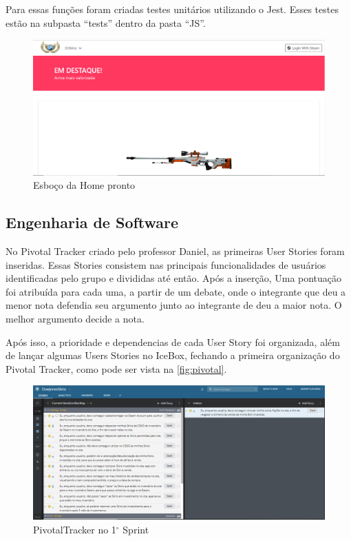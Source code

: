 Para essas funções foram criadas testes unitários utilizando o Jest. Esses testes estão na subpasta ``tests'' 
dentro da pasta ``JS''.\\

\begin{figure}[!htb]
	\centering
	\includegraphics[scale=0.5]{Imagens/Home.png}
	\caption{Esboço da Home pronto}
	\label{fig:home}
\end{figure}

\subsection{Engenharia de Software}
No Pivotal Tracker criado pelo professor Daniel, as primeiras User Stories foram inseridas. Essas Stories consistem 
nas principais funcionalidades de usuários identificadas pelo grupo e divididas até então. Após a inserção, 
Uma pontuação foi atribuída para cada uma, a partir de um debate, onde o integrante que deu a menor nota defendia seu argumento 
junto ao integrante de deu a maior nota. O melhor argumento decide a nota.

Após isso, a prioridade e dependencias de cada User Story foi organizada, além de lançar algumas Users Stories no IceBox, fechando a primeira organização do Pivotal Tracker, como pode ser vista na \autoref{fig:pivotal}.\\

\begin{figure}[!htb]
	\centering
	\includegraphics[scale=0.4]{Imagens/Pivotal1.png}
	\caption{PivotalTracker no 1$^{\circ}$ Sprint}
	\label{fig:pivotal}
\end{figure}

